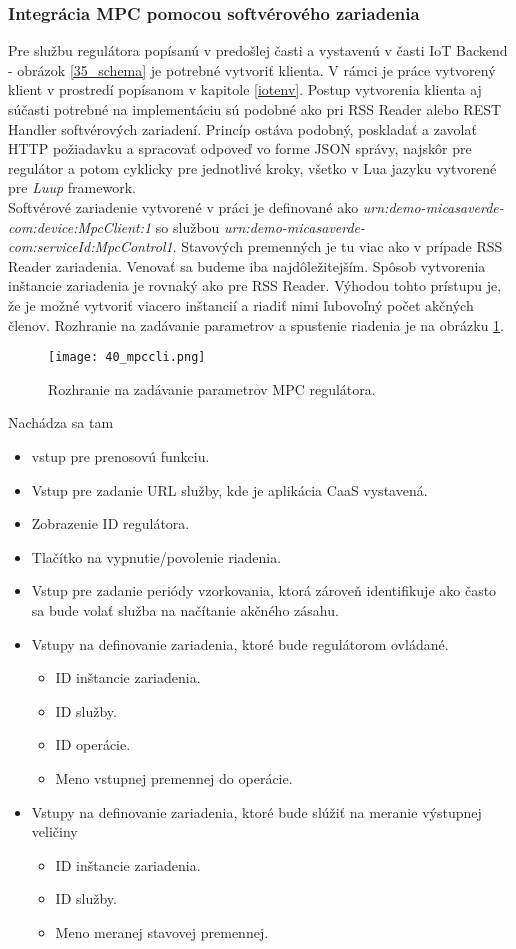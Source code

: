 \subsubsection{Integrácia MPC pomocou softvérového zariadenia} \label{integ}
Pre službu regulátora popísanú v predošlej časti a vystavenú v časti IoT Backend - obrázok \ref{35_schema} je potrebné vytvoriť klienta. V rámci je práce vytvorený klient v prostredí popísanom v kapitole \ref{iotenv}. Postup vytvorenia klienta aj súčasti potrebné na implementáciu sú podobné ako pri RSS Reader alebo REST Handler softvérových zariadení. Princíp ostáva podobný, poskladať a zavolať HTTP požiadavku a spracovať odpoveď vo forme JSON správy, najskôr pre regulátor a potom cyklicky pre jednotlivé kroky, všetko v Lua jazyku vytvorené pre \textit{Luup} framework.\\
\indent Softvérové zariadenie vytvorené v práci je definované ako \textit{urn:demo-micasaverde-com:device:MpcClient:1} so službou \textit{urn:demo-micasaverde-com:serviceId:MpcControl1}. Stavových premenných je tu viac ako v prípade RSS Reader zariadenia. Venovať sa budeme iba najdôležitejším. Spôsob vytvorenia inštancie zariadenia je rovnaký ako pre RSS Reader. Výhodou tohto prístupu je, že je možné vytvoriť viacero inštancií a riadiť nimi ľubovoľný počet akčných členov. Rozhranie na zadávanie parametrov a spustenie riadenia je na obrázku  \ref{40_mpccli}.
\begin{figure}[!htbp]
\centering
\texttt{[image: 40\_mpccli.png]}
\caption{Rozhranie na zadávanie parametrov MPC regulátora.}
\label{40_mpccli}
\end{figure} 
Nachádza sa tam
\begin{itemize}
  \item vstup pre prenosovú funkciu.
  \item Vstup pre zadanie URL služby, kde je aplikácia CaaS vystavená.
  \item Zobrazenie ID regulátora.
  \item Tlačítko na vypnutie/povolenie riadenia.
  \item Vstup pre zadanie periódy vzorkovania, ktorá zároveň identifikuje ako často sa bude volať služba na načítanie akčného zásahu.
  \item Vstupy na definovanie zariadenia, ktoré bude regulátorom ovládané.  
  \begin{itemize}
    \item ID inštancie zariadenia.
    \item ID služby.    
    \item ID operácie.    
    \item Meno vstupnej premennej do operácie.
  \end{itemize} 
  \item Vstupy na definovanie zariadenia, ktoré bude slúžiť na meranie výstupnej veličiny
  \begin{itemize}
    \item ID inštancie zariadenia.
    \item ID služby.    
    \item Meno meranej stavovej premennej.    
  \end{itemize}     
\end{itemize}
